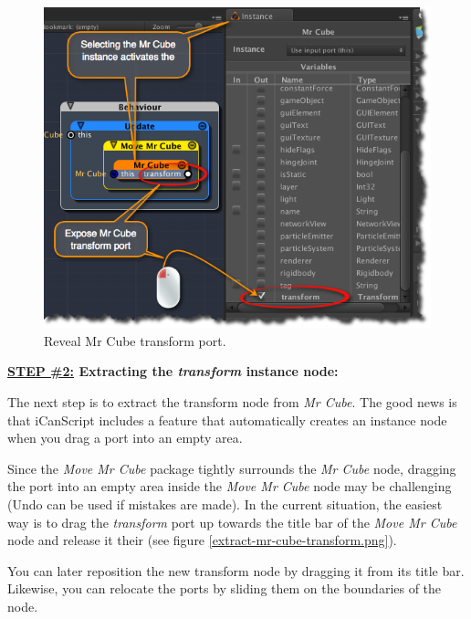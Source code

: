 \begin{figure}[htbp]
\centering
\includegraphics[keepaspectratio,width=\textwidth,height=0.75\textheight]{reveal-mr-cube-transform.png}
\caption{Reveal Mr Cube transform port.}
\label{reveal-mr-cube-transform.png}
\end{figure}

\textbf{\underline{STEP \#2:} Extracting the \emph{transform} instance node:}

The next step is to extract the transform node from \emph{Mr Cube}. The good news is that iCanScript includes a feature that automatically creates an instance node when you drag a port into an empty area.

Since the \emph{Move Mr Cube} package tightly surrounds the \emph{Mr Cube} node, dragging the port into an empty area inside the \emph{Move Mr Cube} node may be challenging (Undo can be used if mistakes are made). In the current situation, the easiest way is to drag the \emph{transform} port up towards the title bar of the \emph{Move Mr Cube} node and release it their (see figure \ref{extract-mr-cube-transform.png}).

You can later reposition the new transform node by dragging it from its title bar. Likewise, you can relocate the ports by sliding them on the boundaries of the node. 


